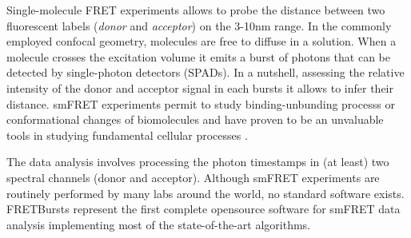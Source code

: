 
Single-molecule FRET experiments allows to probe the distance between two fluorescent labels (\textit{donor} and \textit{acceptor}) on the 3-10nm range. In the commonly employed confocal geometry, molecules are free to diffuse in a solution. When a molecule crosses the excitation volume it emits a burst of photons that can be detected by single-photon detectors (SPADs). In a nutshell, assessing the relative intensity of the donor and acceptor signal in each bursts it allows to infer their distance. smFRET experiments permit to study binding-unbunding processs or conformational changes of biomolecules and have proven to be an unvaluable tools in studying fundamental cellular processes \cite{Kapanidis_2006}.

The data analysis involves processing the photon timestamps in (at least) two spectral channels (donor and acceptor). 
Although smFRET experiments are routinely performed by many labs around the world, no standard software exists. FRETBursts represent the first complete opensource software for smFRET data analysis implementing most of the state-of-the-art algorithms. 

